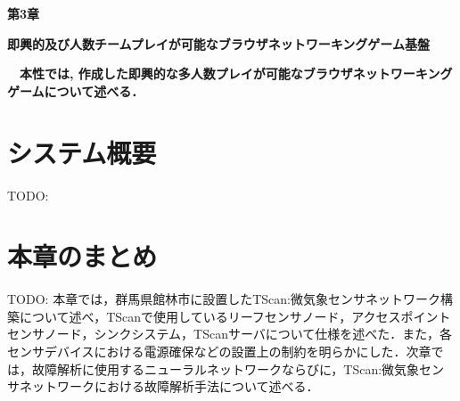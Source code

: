 \newpage
\setcounter{chapter}{3}
\setcounter{section}{0}

\begin{center}
\vspace{0.5cm}
\huge{\bf 第3章}
\par
\vspace{1cm}
\hrulefill
\par
\vspace{1cm}
\huge{\bf 即興的及び人数チームプレイが可能なブラウザネットワーキングゲーム基盤}
\par
\vspace{0.5cm}
\hrulefill
\vspace{1cm}
\par

\begin{flushleft}
\large{{\bf　本性では, 作成した即興的な多人数プレイが可能なブラウザネットワーキングゲームについて述べる．}}
\end{flushleft}
\end{center}


\newpage
\section{システム概要}
TODO:\\


% 


\newpage

\section{本章のまとめ}
TODO: 本章では，群馬県館林市に設置したTScan:微気象センサネットワーク構築について述べ，TScanで使用しているリーフセンサノード，アクセスポイントセンサノード，シンクシステム，TScanサーバについて仕様を述べた．また，各センサデバイスにおける電源確保などの設置上の制約を明らかにした．次章では，故障解析に使用するニューラルネットワークならびに，TScan:微気象センサネットワークにおける故障解析手法について述べる．

\newpage
